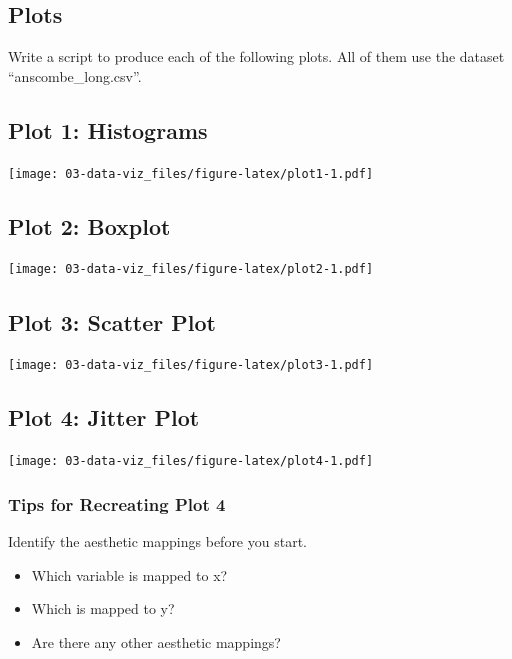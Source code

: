 \documentclass[
]{book}
\providecommand{\tightlist}{%
  \setlength{\itemsep}{0pt}\setlength{\parskip}{0pt}}
\begin{document}
\hypertarget{plots}{%
\subsection{Plots}\label{plots}}

Write a script to produce each of the following plots. All of them use the dataset ``anscombe\_long.csv''.

\hypertarget{plot-1-histograms}{%
\subsection{Plot 1: Histograms}\label{plot-1-histograms}}

\texttt{[image: 03-data-viz\_files/figure-latex/plot1-1.pdf]}

\hypertarget{plot-2-boxplot}{%
\subsection{Plot 2: Boxplot}\label{plot-2-boxplot}}

\texttt{[image: 03-data-viz\_files/figure-latex/plot2-1.pdf]}

\hypertarget{plot-3-scatter-plot}{%
\subsection{Plot 3: Scatter Plot}\label{plot-3-scatter-plot}}

\texttt{[image: 03-data-viz\_files/figure-latex/plot3-1.pdf]}

\hypertarget{plot-4-jitter-plot}{%
\subsection{Plot 4: Jitter Plot}\label{plot-4-jitter-plot}}

\texttt{[image: 03-data-viz\_files/figure-latex/plot4-1.pdf]}

\hypertarget{tips-for-recreating-plot-4}{%
\subsubsection*{Tips for Recreating Plot 4}\label{tips-for-recreating-plot-4}}

Identify the aesthetic mappings before you start.

\begin{itemize}
\tightlist
\item
  Which variable is mapped to x?
\item
  Which is mapped to y?
\item
  Are there any other aesthetic mappings?
\end{itemize}
\end{document}
